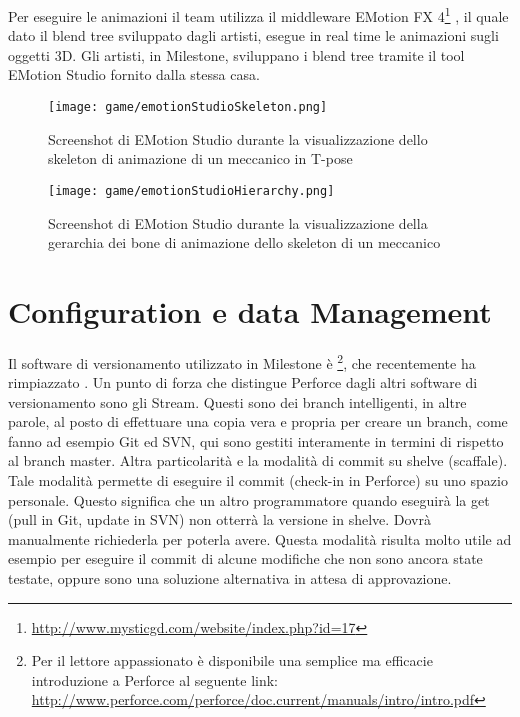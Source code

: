 Per eseguire le animazioni il team utilizza il middleware EMotion FX 4\footnote{\url{http://www.mysticgd.com/website/index.php?id=17}} , il quale dato il blend tree sviluppato dagli artisti, esegue in real time le animazioni sugli oggetti 3D. Gli artisti, in Milestone, sviluppano i blend tree tramite il tool EMotion Studio fornito dalla stessa casa.

\begin{figure}[!h]
	\centering
	\texttt{[image: game/emotionStudioSkeleton.png]}
	\caption{Screenshot di EMotion Studio durante la visualizzazione dello skeleton di animazione di un meccanico in T-pose}
	\label{fig:screenshot-emotion-studio-1}
\end{figure}

\begin{figure}[!h]
	\centering
	\texttt{[image: game/emotionStudioHierarchy.png]}
	\caption{Screenshot di EMotion Studio durante la visualizzazione della gerarchia dei bone di animazione dello skeleton di un meccanico}
	\label{fig:screenshot-emotion-studio-1}
\end{figure}

\section{Configuration e data Management}

Il software di versionamento utilizzato in Milestone è \footnote{Per il lettore appassionato è disponibile una semplice ma efficacie introduzione a Perforce\textsuperscript{\textregistered} al seguente link: \url{http://www.perforce.com/perforce/doc.current/manuals/intro/intro.pdf}}, che recentemente ha rimpiazzato . Un punto di forza che distingue Perforce\textsuperscript{\textregistered} dagli altri software di versionamento sono gli Stream. Questi sono dei branch intelligenti, in altre parole, al posto di effettuare una copia vera e propria per creare un branch, come fanno ad esempio Git\textsuperscript{\textregistered} ed SVN\textsuperscript{\textregistered}, qui sono gestiti interamente in termini di  rispetto al branch master. Altra particolarità e la modalità di commit su shelve (scaffale). Tale modalità permette di eseguire il commit (check-in in Perforce\textsuperscript{\textregistered}) su uno spazio personale. Questo significa che un altro programmatore quando eseguirà la get (pull in Git\textsuperscript{\textregistered}, update in SVN\textsuperscript{\textregistered}) non otterrà la versione in shelve. Dovrà manualmente richiederla per poterla avere. Questa modalità risulta molto utile ad esempio per eseguire il commit di alcune modifiche che non sono ancora state testate, oppure sono una soluzione alternativa in attesa di approvazione.

